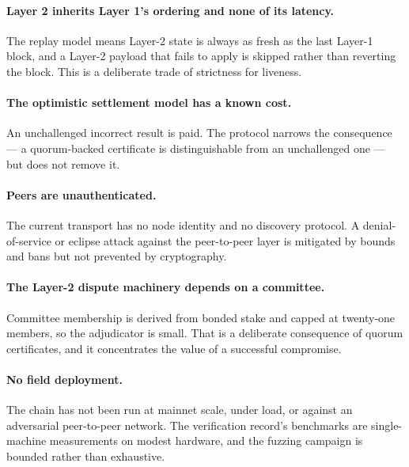 \documentclass{article}
\begin{document}
\paragraph{Layer 2 inherits Layer 1's ordering and none of its latency.} The
replay model means Layer-2 state is always as fresh as the last Layer-1 block,
and a Layer-2 payload that fails to apply is skipped rather than reverting the
block. This is a deliberate trade of strictness for liveness.

\paragraph{The optimistic settlement model has a known cost.} An unchallenged
incorrect result is paid. The protocol narrows the consequence --- a
quorum-backed certificate is distinguishable from an unchallenged one --- but
does not remove it.

\paragraph{Peers are unauthenticated.} The current transport has no node
identity and no discovery protocol. A denial-of-service or eclipse attack
against the peer-to-peer layer is mitigated by bounds and bans but not
prevented by cryptography.

\paragraph{The Layer-2 dispute machinery depends on a committee.} Committee
membership is derived from bonded stake and capped at twenty-one members, so
the adjudicator is small. That is a deliberate consequence of quorum
certificates, and it concentrates the value of a successful compromise.

\paragraph{No field deployment.} The chain has not been run at mainnet scale,
under load, or against an adversarial peer-to-peer network. The verification
record's benchmarks are single-machine measurements on modest hardware, and the
fuzzing campaign is bounded rather than exhaustive.
\end{document}
